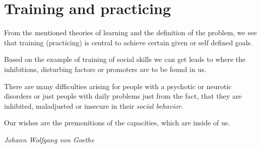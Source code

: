 \documentclass[../main.tex]{subfiles}
\begin{document}
        \section{Training and practicing}

        From the mentioned theories of learning and the definition of the problem, we see that training (practicing) is central to achieve certain given or self defined goals.


        Based on the example of training of social skills we can get leads to where the inhibitions, disturbing factors or promoters are to be found in us.

        There are many difficulties arising for people with a psychotic or neurotic disorders or just people with daily problems just from the fact, that they are inhibited, maladjusted or insecure in their \emph{social behavior}.


\epigraph{Our wishes are the premonitions of the capacities, which are inside of us.}{\textit{Johann Wolfgang von Goethe}}

\label{metacognitive}
\end{document}
